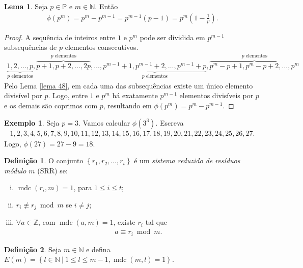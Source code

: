 \documentclass[a4paper,11pt,twoside, leqno]{article}
\DeclareMathOperator{\mdc}{mdc}
\theoremstyle{definition}
\newtheorem*{definition}{Definição}
\newtheorem{lemma}[theorem]{Lema}
\newtheorem*{example}{Exemplo}
\begin{document}
\begin{lemma}
	\label{lema 49}
	Seja $p\in\mathbb{P}$ e $m\in\mathbb{N}$. Então
	\begin{align*}
	\phi(p^m) = p^m - p^{m-1} = p^{m-1}(p - 1) = p^m\left(1 - \frac{1}{p}\right).
	\end{align*}
\end{lemma}
\begin{proof}
	A sequência de inteiros entre $1$ e $p^m$ pode ser dividida em $p^{m-1}$ subsequências de $p$ elementos consecutivos.
	\begin{align*}
	\underbrace{1,2,\dots,p}_{p \text{ elementos}},\overbrace{p+1, p+2, \dots, 2p}^{p \text{ elementos}}, \dots, \underbrace{p^{m-1} + 1,p^{m-1}+2,\dots,p^{m-1} + p}_{p \text{ elementos}},\overbrace{p^m-p+1, p^m-p+2, \dots, p^m}^{p \text{ elementos}}
	\end{align*}
	Pelo Lema \eqref{lema 48}, em cada uma das subsequências existe um único elemento divisível por $p$. Logo, entre $1$ e $p^m$ há exatamente $p^{m-1}$ elementos divisíveis por $p$ e os demais são coprimos com $p$, resultando em $\phi(p^m) = p^m - p^{m-1}$.
\end{proof}
\begin{example}
	Seja $p=3$. Vamos calcular $\phi(3^3)$. Escreva
	\begin{align*}
	1, 2, 3, 4, 5, 6, 7, 8, 9, 10, 11, 12, 13, 14, 15, 16, 17, 18, 19, 20, 21, 22, 23, 24, 25, 26, 27.
	\end{align*}
	Logo, $\phi(27) = 27 - 9 = 18$.
\end{example}
\begin{definition}
	\label{ssr}
	O conjunto $\left\{ r_1, r_2, \dots, r_t \right\}$ é um {\em sistema reduzido de resíduos módulo $m$} (SRR) se:
	\begin{enumerate}[(i)]
		\item $\mdc(r_i, m) = 1$, para $1\leq i\leq t$;
		\item $r_i\not\equiv r_j\bmod m$ se $i\neq j$;
		\item $\forall a\in\mathbb{Z}$, com $\mdc(a,m) = 1$, existe $r_i$ tal que
		\begin{align*}
		a\equiv r_i\bmod m.
		\end{align*}
	\end{enumerate}
\end{definition}
\begin{definition}
	Seja $m\in\mathbb{N}$ e defina $E(m) = \left\{ l\in\mathbb{N} \ | \ 1\leq l\leq m-1, \mdc(m,l) = 1 \right\}$.
\end{definition}
\end{document}
